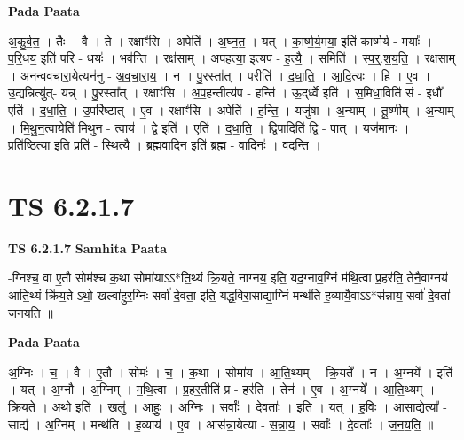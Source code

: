 \documentclass[17pt]{extarticle}
\begin{document}
\textbf{Pada Paata} \newline

अ॒कु॒र्व॒त॒ । तैः । वै । ते । रक्षाꣳ॑सि । अपेति॑ । अ॒घ्न॒त॒ । यत् । का॒र्ष्म॒र्य॒मया॒ इति॑ कार्ष्मर्य - मयाः᳚ । प॒रि॒धय॒ इति॑ परि - धयः॑ । भव॑न्ति । रक्ष॑साम् । अप॑हत्या॒ इत्यप॑ - ह॒त्यै॒ । समिति॑ । स्प॒र्॒.श॒य॒ति॒ । रक्ष॑साम् । अन॑न्ववचारा॒येत्यन॑नु - अ॒व॒चा॒रा॒य॒ । न । पु॒रस्ता᳚त् । परीति॑ । द॒धा॒ति॒ । आ॒दि॒त्यः । हि । ए॒व । उ॒द्यन्नित्यु॑त्- यन्न् । पु॒रस्ता᳚त् । रक्षाꣳ॑सि । अ॒प॒हन्तीत्य॑प - हन्ति॑ । ऊ॒द्‌र्ध्वे इति॑ । स॒मिधा॒विति॑ सं - इधौ᳚ । एति॑ । द॒धा॒ति॒ । उ॒परि॑ष्टात् । ए॒व । रक्षाꣳ॑सि । अपेति॑ । ह॒न्ति॒ । यजु॑षा । अ॒न्याम् । तू॒ष्णीम् । अ॒न्याम् । मि॒थु॒न॒त्वायेति॑ मिथुन - त्वाय॑ । द्वे इति॑ । एति॑ । द॒धा॒ति॒ । द्वि॒पादिति॑ द्वि - पात् । यज॑मानः । प्रति॑ष्ठित्या॒ इति॒ प्रति॑ - स्थि॒त्यै॒ । ब्र॒ह्म॒वा॒दिन॒ इति॑ ब्रह्म - वा॒दिनः॑ । व॒द॒न्ति॒ ।  \newline




\section*{ TS 6.2.1.7 }

\textbf{TS 6.2.1.7 } \newline
\textbf{Samhita Paata} \newline

-ग्निश्च॒ वा ए॒तौ सोम॑श्च क॒था सोमा॑याऽऽ*ति॒थ्यं क्रि॒यते॒ नाग्नय॒ इति॒ यद॒ग्नाव॒ग्निं म॑थि॒त्वा प्र॒हर॑ति॒ तेनै॒वाग्नय॑ आति॒थ्यं क्रि॑य॒ते ऽथो॒ खल्वा॑हुर॒ग्निः सर्वा॑ दे॒वता॒ इति॒ यद्ध॒विरा॒साद्या॒ग्निं मन्थ॑ति ह॒व्यायै॒वाऽऽ*स॑न्नाय॒ सर्वा॑ दे॒वता॑ जनयति ॥ \newline

\textbf{Pada Paata} \newline

अ॒ग्निः । च॒ । वै । ए॒तौ । सोमः॑ । च॒ । क॒था । सोमा॑य । आ॒ति॒थ्यम् । क्रि॒यते᳚ । न । अ॒ग्नये᳚ । इति॑ । यत् । अ॒ग्नौ । अ॒ग्निम् । म॒थि॒त्वा । प्र॒हर॒तीति॑ प्र - हर॑ति । तेन॑ । ए॒व । अ॒ग्नये᳚ । आ॒ति॒थ्यम् । क्रि॒य॒ते॒ । अथो॒ इति॑ । खलु॑ । आ॒हुः॒ । अ॒ग्निः । सर्वाः᳚ । दे॒वताः᳚ । इति॑ । यत् । ह॒विः । आ॒साद्येत्या᳚ - साद्य॑ । अ॒ग्निम् । मन्थ॑ति । ह॒व्याय॑ । ए॒व । आस॑न्ना॒येत्या - स॒न्ना॒य॒ । सर्वाः᳚ । दे॒वताः᳚ । ज॒न॒य॒ति॒ ॥  \newline




\end{document}
